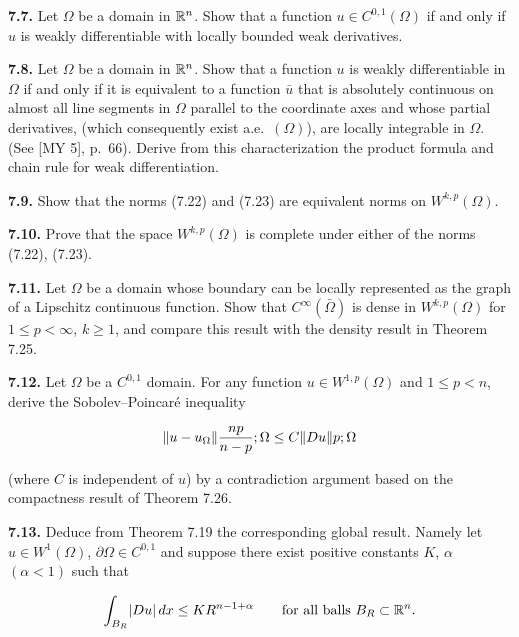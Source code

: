 \bigskip

\noindent\textbf{7.7.} Let $\Omega$ be a domain in $\mathbb{R}^n$. Show that a function $u \in C^{0,1}(\Omega)$ if and only if
$u$ is weakly differentiable with locally bounded weak derivatives.

\bigskip

\noindent\textbf{7.8.} Let $\Omega$ be a domain in $\mathbb{R}^n$. Show that a function $u$ is weakly differentiable in
$\Omega$ if and only if it is equivalent to a function $\bar{u}$ that is absolutely continuous on
almost all line segments in $\Omega$ parallel to the coordinate axes and whose partial
derivatives, (which consequently exist a.e.\ $(\Omega)$), are locally integrable in $\Omega$. (See
[MY 5], p.\ 66). Derive from this characterization the product formula and chain
rule for weak differentiation.

\bigskip

\noindent\textbf{7.9.} Show that the norms (7.22) and (7.23) are equivalent norms on $W^{k,p}(\Omega)$.

\bigskip

\noindent\textbf{7.10.} Prove that the space $W^{k,p}(\Omega)$ is complete under either of the norms (7.22),
(7.23).

\bigskip

\noindent\textbf{7.11.} Let $\Omega$ be a domain whose boundary can be locally represented as the graph
of a Lipschitz continuous function. Show that $C^\infty(\bar{\Omega})$ is dense in $W^{k,p}(\Omega)$ for
$1 \leq p < \infty$, $k \geq 1$, and compare this result with the density result in Theorem 7.25.

\bigskip

\noindent\textbf{7.12.} Let $\Omega$ be a $C^{0,1}$ domain. For any function $u \in W^{1,p}(\Omega)$ and $1 \leq p < n$, derive
the Sobolev--Poincar\'e inequality

\[
\lVert u-u_\Omega\rVert{\frac{np}{n-p};\Omega} \leq C\lVert Du\rVert{p;\Omega}
\]

\noindent(where $C$ is independent of $u$) by a contradiction argument based on the compactness
result of Theorem 7.26.

\bigskip

\noindent\textbf{7.13.} Deduce from Theorem 7.19 the corresponding global result. Namely let
$u \in W^1(\Omega)$, $\partial \Omega \in C^{0,1}$ and suppose there exist positive constants $K$, $\alpha$ $(\alpha < 1)$ such
that

\[
\int_{B_R} \lvert Du\rvert\, dx \leq KR^{n-1+\alpha}\qquad \text{for all balls } B_R \subset \mathbb{R}^n.
\]


